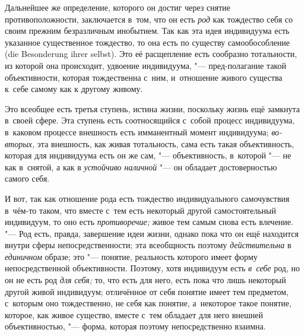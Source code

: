 Дальнейшее же определение, которого он достиг через снятие
противоположности, заключается в~том, что он есть
{\em род} как тождество
себя со своим прежним безразличным инобытием. Так как эта
идея индивидуума есть указанное существенное тождество, то она есть по
существу самообособление (die Besonderung ihrer selbst). Это
её расщепление есть сообразно тотальности, из которой она происходит,
удвоение индивидуума, "--- пред-полагание такой объективности,
которая тождественна с~ним, и~отношение живого существа к~себе самому как к
другому живому.

Это всеобщее есть третья ступень, истина жизни, поскольку
жизнь ещё замкнута в~своей сфере. Эта ступень есть соотносящийся с~собой
процесс индивидуума, в~каковом процессе внешность есть имманентный момент
индивидуума; {\em во-вторых,}
эта внешность, как живая тотальность, сама есть такая
объективность, которая для индивидуума есть он же сам, "---
объективность, в~которой "--- не как в~снятой, а
как в {\em устойчиво наличной}
"--- он обладает достоверностью самого себя.

И вот, так как отношение рода есть тождество индивидуального
самочувствия в~чём-то таком, что вместе с~тем есть некоторый другой
самостоятельный индивидуум, то оно есть {\em противоречие;} живое
тем самым снова есть влечение. "--- Род есть, правда,
завершение идеи жизни, однако пока что он ещё находится внутри сферы
непосредственности; эта всеобщность поэтому
{\em действительна} в {\em единичном} образе;
это "--- понятие, реальность которого имеет форму
непосредственной объективности. Поэтому, хотя индивидуум есть
{\em в~себе} род, но он не есть род {\em для себя;}
то, что есть для него, есть пока что лишь некоторый другой
живой индивидуум; отличённое от себя понятие имеет тем предметом, с~которым
оно тождественно, не себя как понятие, а~некоторое такое понятие, которое,
как живое существо, вместе с~тем обладает для него внешней объективностью,
"--- форма, которая поэтому непосредственно взаимна.

